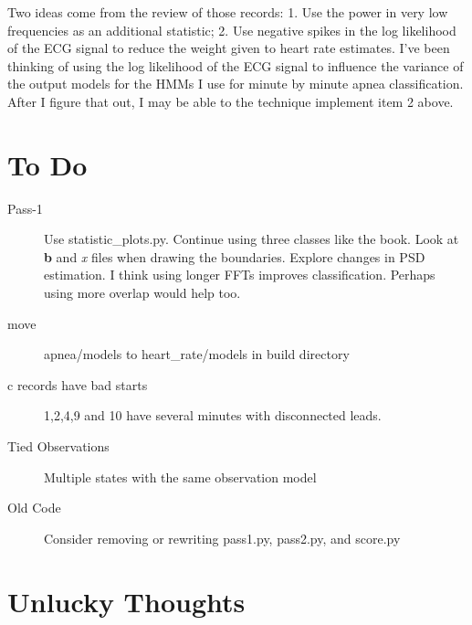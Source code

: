 \documentclass[12pt]{article}
\begin{document}
Two ideas come from the review of those records: 1. Use the power in
very low frequencies as an additional statistic; 2. Use negative
spikes in the log likelihood of the ECG signal to reduce the weight
given to heart rate estimates.  I've been thinking of using the log
likelihood of the ECG signal to influence the variance of the output
models for the HMMs I use for minute by minute apnea classification.
After I figure that out, I may be able to the technique implement item
2 above.


\section{To Do}
\label{sec:todo}

\begin{description}
\item[Pass-1] Use statistic\_plots.py.  Continue using three classes
  like the book.  Look at \textbf{b} and \emph{x} files when drawing
  the boundaries.  Explore changes in PSD estimation.  I think using
  longer FFTs improves classification.  Perhaps using more overlap
  would help too.
\item[move] apnea/models to heart\_rate/models in build directory
\item[c records have bad starts] 1,2,4,9 and 10 have several minutes
  with disconnected leads.
\item[Tied Observations] Multiple states with the same observation
  model
\item[Old Code] Consider removing or rewriting pass1.py, pass2.py, and
  score.py 
\end{description}

\section{Unlucky Thoughts}
\label{sec:unlucky}
\end{document}
